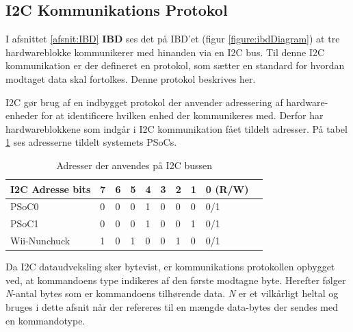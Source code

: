 \subsection{I2C Kommunikations Protokol}

I afsnittet \ref{afsnit:IBD} \textbf{IBD} ses det på IBD'et (figur \ref{figure:ibdDiagram}) at tre hardwareblokke kommunikerer med hinanden via en I2C bus. Til denne I2C kommunikation er der defineret en protokol, som sætter en standard for hvordan modtaget data skal fortolkes. Denne protokol beskrives her.

I2C gør brug af en indbygget protokol der anvender adressering af hardware-enheder for at identificere hvilken enhed der kommunikeres med. Derfor har hardwareblokkene som indgår i I2C kommunikation fået tildelt adresser. På tabel \ref{table:I2CAddress} ses adresserne tildelt systemets PSoCs.

\begin{table}[H]
	\centering
	\begin{tabular}{llllllllll}
		\hline
		\multicolumn{1}{|l|}{I2C Adresse bits} & 7                        & 6                        & 5                        & 4 & 3 & 2 & \multicolumn{1}{l|}{1} & \multicolumn{1}{l|}{0 (R/W)} \\ \hline
		\rowcolor[HTML]{CBCEFB} 
		{\color[HTML]{000000} PSoC0}           & {\color[HTML]{000000} 0} & {\color[HTML]{000000} 0} & {\color[HTML]{000000} 0} & 1 & 0 & 0 & 0                      & 0/1                          \\
		PSoC1                                  & 0                        & 0                        & 0                        & 1 & 0 & 0 & 1                      & 0/1 \\
		\rowcolor[HTML]{CBCEFB} 
		{\color[HTML]{000000} Wii-Nunchuck}           & {\color[HTML]{000000} 1} & {\color[HTML]{000000} 0} & {\color[HTML]{000000} 1} & 0 & 0 & 1 & 0                      & 0/1                      
	\end{tabular}
	\caption{Adresser der anvendes på I2C bussen}
	\label{table:I2CAddress}
\end{table}

Da I2C dataudveksling sker bytevist, er kommunikations protokollen opbygget ved, at kommandoens type indikeres af den første modtagne byte. Herefter følger \textit{N}-antal bytes som er kommandoens tilhørende data. \textit{N} er et vilkårligt heltal og bruges i dette afsnit når der refereres til en mængde data-bytes der sendes med en kommandotype.

